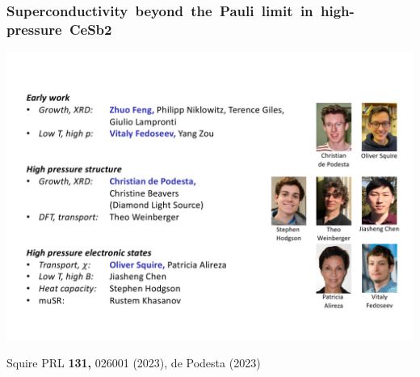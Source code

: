 


\begin{frame}[plain,label=CeSb2Grouplist]
    \frametitle {\mbox{Superconductivity beyond the Pauli limit in high-pressure CeSb2}}
    \includegraphics[width=1.2\textwidth]{GroupList}
    
    \vfill
\centerline{\makebox[\linewidth]{\rule{0.85\textwidth}{0.4pt}}}

\centerline{\scriptsize Squire PRL {\bf 131,} 026001 (2023), de Podesta (2023)}

    \end{frame}
    
     


